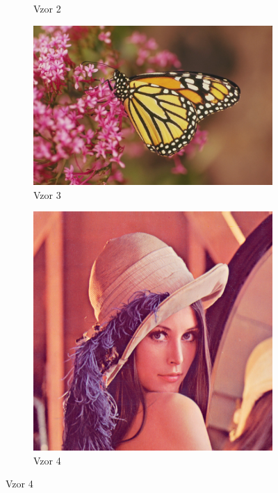 \documentclass[a4paper,11pt,titlepage]{scrartcl}
\begin{document}
\begin{figure}[!h]
\begin{subfigure}[b]{0.4\textwidth}
        \caption{Vzor 2}
        \label{fig:gull}
    \end{subfigure}
    \begin{subfigure}[b]{0.4\textwidth}
        \includegraphics[width=\textwidth]{img/example3.png}
        \caption{Vzor 3}
        \label{fig:gull}
    \end{subfigure}
    \begin{subfigure}[b]{0.4\textwidth}
        \includegraphics[width=\textwidth]{img/example4.png}
        \caption{Vzor 4}
        \label{fig:gull}

\end{subfigure}
\end{figure}
\end{document}
